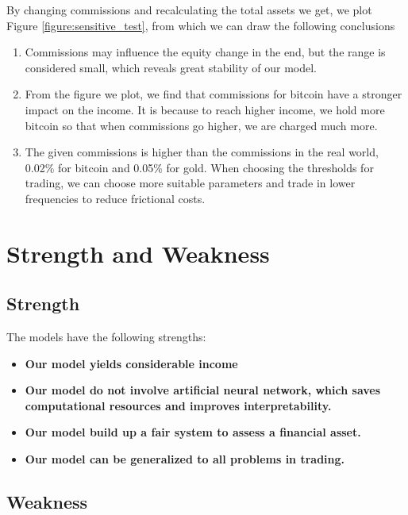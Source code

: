 \documentclass[12pt,a4paper]{article}
\begin{document}
\begin{spacing}{1.2}
By changing commissions and recalculating the total assets we get, we plot Figure \ref{figure:sensitive_test}, from which we can draw the following conclusions

\begin{enumerate}
	\item Commissions may influence the equity change in the end, but the range is considered small, which reveals great stability of our model.
	
	\item From the figure we plot, we find that commissions for bitcoin have a stronger impact on the income. It is because to reach higher income, we hold more bitcoin so that when commissions go higher, we are charged much more.
	
	\item The given commissions is higher than the commissions in the real world, 0.02\% for bitcoin and 0.05\% for gold. When choosing the thresholds for trading, we can choose more suitable parameters and trade in lower frequencies to reduce frictional costs.
\end{enumerate}

\section{Strength and Weakness}
\label{Strength_Weakness}


\subsection{Strength}

The models have the following strengths:

\begin{itemize}
\item \textbf{Our model yields considerable income}

\item \textbf{Our model do not involve artificial neural network, which saves computational resources and improves interpretability.}

\item \textbf{Our model build up a fair system to assess a financial asset.}

\item \textbf{Our model can be generalized to all problems in trading.}

\end{itemize}


\subsection{Weakness}


\end{spacing}
\end{document}
